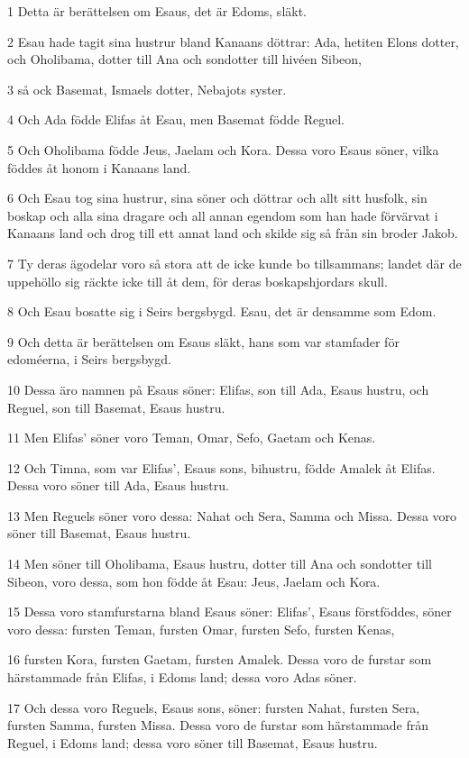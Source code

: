 \par 1 Detta är berättelsen om Esaus, det är Edoms, släkt.
\par 2 Esau hade tagit sina hustrur bland Kanaans döttrar: Ada, hetiten Elons dotter, och Oholibama, dotter till Ana och sondotter till hivéen Sibeon,
\par 3 så ock Basemat, Ismaels dotter, Nebajots syster.
\par 4 Och Ada födde Elifas åt Esau, men Basemat födde Reguel.
\par 5 Och Oholibama födde Jeus, Jaelam och Kora. Dessa voro Esaus söner, vilka föddes åt honom i Kanaans land.
\par 6 Och Esau tog sina hustrur, sina söner och döttrar och allt sitt husfolk, sin boskap och alla sina dragare och all annan egendom som han hade förvärvat i Kanaans land och drog till ett annat land och skilde sig så från sin broder Jakob.
\par 7 Ty deras ägodelar voro så stora att de icke kunde bo tillsammans; landet där de uppehöllo sig räckte icke till åt dem, för deras boskapshjordars skull.
\par 8 Och Esau bosatte sig i Seirs bergsbygd. Esau, det är densamme som Edom.
\par 9 Och detta är berättelsen om Esaus släkt, hans som var stamfader för edoméerna, i Seirs bergsbygd.
\par 10 Dessa äro namnen på Esaus söner: Elifas, son till Ada, Esaus hustru, och Reguel, son till Basemat, Esaus hustru.
\par 11 Men Elifas' söner voro Teman, Omar, Sefo, Gaetam och Kenas.
\par 12 Och Timna, som var Elifas', Esaus sons, bihustru, födde Amalek åt Elifas. Dessa voro söner till Ada, Esaus hustru.
\par 13 Men Reguels söner voro dessa: Nahat och Sera, Samma och Missa. Dessa voro söner till Basemat, Esaus hustru.
\par 14 Men söner till Oholibama, Esaus hustru, dotter till Ana och sondotter till Sibeon, voro dessa, som hon födde åt Esau: Jeus, Jaelam och Kora.
\par 15 Dessa voro stamfurstarna bland Esaus söner: Elifas', Esaus förstföddes, söner voro dessa: fursten Teman, fursten Omar, fursten Sefo, fursten Kenas,
\par 16 fursten Kora, fursten Gaetam, fursten Amalek. Dessa voro de furstar som härstammade från Elifas, i Edoms land; dessa voro Adas söner.
\par 17 Och dessa voro Reguels, Esaus sons, söner: fursten Nahat, fursten Sera, fursten Samma, fursten Missa. Dessa voro de furstar som härstammade från Reguel, i Edoms land; dessa voro söner till Basemat, Esaus hustru.
